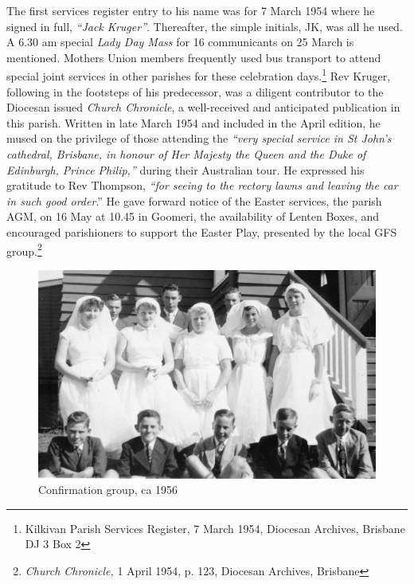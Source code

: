 The first services register entry to his name was for 7 March 1954 where he signed in full, \emph{``Jack Kruger''}. Thereafter, the simple initials, JK, was all he used. A 6.30 am special \emph{Lady Day Mass} for 16 communicants on 25 March is mentioned. Mothers Union members frequently used bus transport to attend special joint services in other parishes for these celebration days.\footnote{Kilkivan Parish Services Register, 7 March 1954, Diocesan Archives, Brisbane DJ 3 Box 2} Rev Kruger, following in the footsteps of his predecessor, was a diligent contributor to the Diocesan issued \emph{Church Chronicle}, a well-received and anticipated publication in this parish. Written in late March 1954 and included in the April edition, he mused on the privilege of those attending the \emph{``very special service in St John's cathedral, Brisbane, in honour of Her Majesty the Queen and the Duke of Edinburgh, Prince Philip,''} during their Australian tour. He expressed his gratitude to Rev Thompson, \emph{``for seeing to the rectory lawns and leaving the car in such good order}.'' He gave forward notice of the Easter services, the parish AGM, on 16 May at 10.45 in Goomeri, the availability of Lenten Boxes, and encouraged parishioners to support the Easter Play, presented by the local GFS group.\footnote{\emph{Church Chronicle,} 1 April 1954, p. 123, Diocesan Archives, Brisbane}








\begin{figure}[!htb]
\begin{center}
\includegraphics[width=1.\textwidth,center]{../images/confirmation1956.jpg}
\caption{Confirmation group, ca 1956}
\end{center}
\end{figure}




